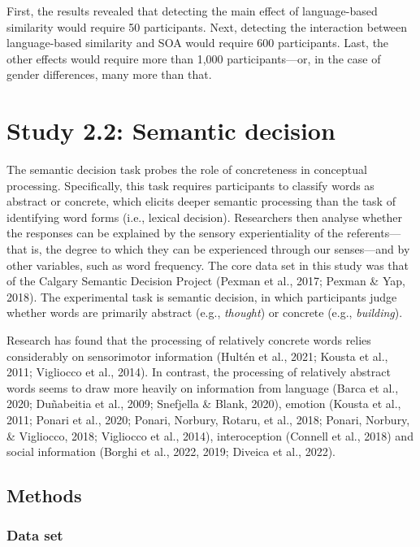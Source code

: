 \documentclass[
  12pt,
  man,floatsintext]{apa7}
\begin{document}
First, the results revealed that detecting the main effect of language-based similarity would require 50 participants. Next, detecting the interaction between language-based similarity and SOA would require 600 participants. Last, the other effects would require more than 1,000 participants---or, in the case of gender differences, many more than that.

\clearpage

\hypertarget{study-2.2-semantic-decision}{%
\section{Study 2.2: Semantic decision}\label{study-2.2-semantic-decision}}

The semantic decision task probes the role of concreteness in conceptual processing. Specifically, this task requires participants to classify words as abstract or concrete, which elicits deeper semantic processing than the task of identifying word forms (i.e., lexical decision). Researchers then analyse whether the responses can be explained by the sensory experientiality of the referents---that is, the degree to which they can be experienced through our senses---and by other variables, such as word frequency. The core data set in this study was that of the Calgary Semantic Decision Project (Pexman et al., 2017; Pexman \& Yap, 2018). The experimental task is semantic decision, in which participants judge whether words are primarily abstract (e.g., \emph{thought}) or concrete (e.g., \emph{building}).

Research has found that the processing of relatively concrete words relies considerably on sensorimotor information (Hultén et al., 2021; Kousta et al., 2011; Vigliocco et al., 2014). In contrast, the processing of relatively abstract words seems to draw more heavily on information from language (Barca et al., 2020; Duñabeitia et al., 2009; Snefjella \& Blank, 2020), emotion (Kousta et al., 2011; Ponari et al., 2020; Ponari, Norbury, Rotaru, et al., 2018; Ponari, Norbury, \& Vigliocco, 2018; Vigliocco et al., 2014), interoception (Connell et al., 2018) and social information (Borghi et al., 2022, 2019; Diveica et al., 2022).

\hypertarget{methods-1}{%
\subsection{Methods}\label{methods-1}}

\hypertarget{data-set}{%
\subsubsection{Data set}\label{data-set}}
\end{document}
